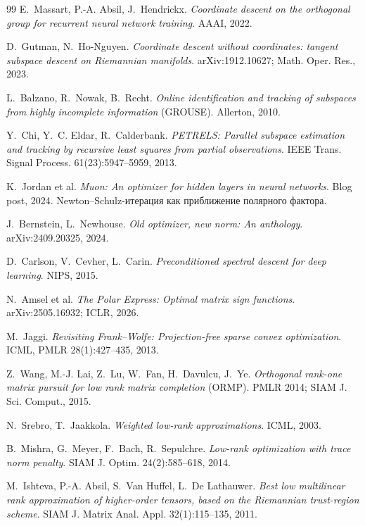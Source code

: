 \documentclass[11pt,a4paper]{article}
\theoremstyle{plain}
\theoremstyle{definition}
\theoremstyle{remark}
\begin{document}
\begin{thebibliography}{99}
E.~Massart, P.-A. Absil, J.~Hendrickx.
\emph{Coordinate descent on the orthogonal group for recurrent neural
network training}. AAAI, 2022.

D.~Gutman, N.~Ho-Nguyen.
\emph{Coordinate descent without coordinates: tangent subspace descent on
Riemannian manifolds}. arXiv:1912.10627; Math. Oper. Res., 2023.

L.~Balzano, R.~Nowak, B.~Recht.
\emph{Online identification and tracking of subspaces from highly
incomplete information} (GROUSE). Allerton, 2010.

Y.~Chi, Y.~C. Eldar, R.~Calderbank.
\emph{PETRELS: Parallel subspace estimation and tracking by recursive
least squares from partial observations}.
IEEE Trans. Signal Process. 61(23):5947--5959, 2013.

K.~Jordan et al.
\emph{Muon: An optimizer for hidden layers in neural networks}.
Blog post, 2024. Newton--Schulz-итерация как приближение полярного фактора.

J.~Bernstein, L.~Newhouse.
\emph{Old optimizer, new norm: An anthology}. arXiv:2409.20325, 2024.

D.~Carlson, V.~Cevher, L.~Carin.
\emph{Preconditioned spectral descent for deep learning}. NIPS, 2015.

N.~Amsel et al.
\emph{The Polar Express: Optimal matrix sign functions}.
arXiv:2505.16932; ICLR, 2026.

M.~Jaggi.
\emph{Revisiting Frank--Wolfe: Projection-free sparse convex optimization}.
ICML, PMLR 28(1):427--435, 2013.

Z.~Wang, M.-J. Lai, Z.~Lu, W.~Fan, H.~Davulcu, J.~Ye.
\emph{Orthogonal rank-one matrix pursuit for low rank matrix completion}
(ORMP). PMLR 2014; SIAM J. Sci. Comput., 2015.

N.~Srebro, T.~Jaakkola.
\emph{Weighted low-rank approximations}. ICML, 2003.

B.~Mishra, G.~Meyer, F.~Bach, R.~Sepulchre.
\emph{Low-rank optimization with trace norm penalty}.
SIAM J. Optim. 24(2):585--618, 2014.

M.~Ishteva, P.-A. Absil, S.~Van Huffel, L.~De Lathauwer.
\emph{Best low multilinear rank approximation of higher-order tensors,
based on the Riemannian trust-region scheme}.
SIAM J. Matrix Anal. Appl. 32(1):115--135, 2011.


\end{thebibliography}
\end{document}

